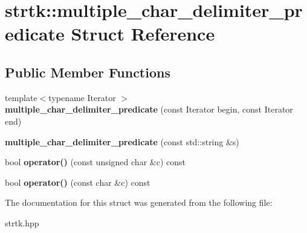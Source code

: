 \hypertarget{structstrtk_1_1multiple__char__delimiter__predicate}{\section{strtk\-:\-:multiple\-\_\-char\-\_\-delimiter\-\_\-predicate Struct Reference}
\label{structstrtk_1_1multiple__char__delimiter__predicate}
}
\subsection*{Public Member Functions}
\begin{DoxyCompactItemize}
\item 
\hypertarget{structstrtk_1_1multiple__char__delimiter__predicate_a6634d2440b9806c2f4f1b404eead662a}{{\footnotesize template$<$typename Iterator $>$ }\\{\bfseries multiple\-\_\-char\-\_\-delimiter\-\_\-predicate} (const Iterator begin, const Iterator end)}\label{structstrtk_1_1multiple__char__delimiter__predicate_a6634d2440b9806c2f4f1b404eead662a}

\item 
\hypertarget{structstrtk_1_1multiple__char__delimiter__predicate_a60d12458ad94f22b7b2209f21b43b4ee}{{\bfseries multiple\-\_\-char\-\_\-delimiter\-\_\-predicate} (const std\-::string \&s)}\label{structstrtk_1_1multiple__char__delimiter__predicate_a60d12458ad94f22b7b2209f21b43b4ee}

\item 
\hypertarget{structstrtk_1_1multiple__char__delimiter__predicate_a43781593a6e76d8251dc0d5aefbce843}{bool {\bfseries operator()} (const unsigned char \&c) const }\label{structstrtk_1_1multiple__char__delimiter__predicate_a43781593a6e76d8251dc0d5aefbce843}

\item 
\hypertarget{structstrtk_1_1multiple__char__delimiter__predicate_ad8d5d933432ea3d2c02572e2ae6590b5}{bool {\bfseries operator()} (const char \&c) const }\label{structstrtk_1_1multiple__char__delimiter__predicate_ad8d5d933432ea3d2c02572e2ae6590b5}

\end{DoxyCompactItemize}


The documentation for this struct was generated from the following file\-:\begin{DoxyCompactItemize}
\item 
strtk.\-hpp\end{DoxyCompactItemize}
